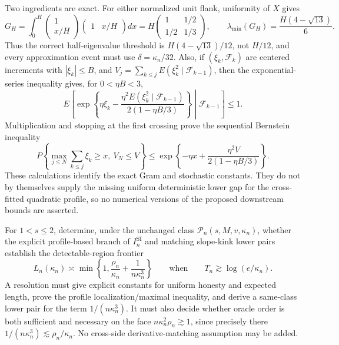 Two ingredients are exact.  For either normalized unit flank,
uniformity of \(X\) gives
\[
 G_H=\int_0^H
 \begin{pmatrix}1\\x/H\end{pmatrix}
 \begin{pmatrix}1&x/H\end{pmatrix}dx
 =H\begin{pmatrix}1&1/2\\1/2&1/3\end{pmatrix},
 \qquad
 \lambda_{\min}(G_H)=\frac{H(4-\sqrt{13})}{6}.
\]
Thus the correct half-eigenvalue threshold is
\(H(4-\sqrt{13})/12\), not \(H/12\), and every approximation event
must use \(\delta=\kappa_n/32\).  Also, if
\((\xi_k,\mathcal F_k)\) are centered increments with
\(|\xi_k|\le B\), and
\(V_j=\sum_{k\le j}E(\xi_k^2\mid\mathcal F_{k-1})\), then the
exponential-series inequality gives, for \(0<\eta B<3\),
\[
 E\left[\exp\left\{\eta\xi_k-
 \frac{\eta^2E(\xi_k^2\mid\mathcal F_{k-1})}
 {2(1-\eta B/3)}\right\}\middle|\mathcal F_{k-1}\right]\le1.
\]
Multiplication and stopping at the first crossing prove the sequential
Bernstein inequality
\[
 P\left\{\max_{j\le N}\sum_{k\le j}\xi_k\ge x,
                 \ V_N\le V\right\}
 \le\exp\left\{-\eta x+
 \frac{\eta^2V}{2(1-\eta B/3)}\right\}.
\]
These calculations identify the exact Gram and stochastic constants.
They do not by themselves supply the missing uniform deterministic
lower gap for the cross-fitted quadratic profile, so no numerical
versions of the proposed downstream bounds are asserted.

For \(1<s\le2\), determine, under the unchanged class
\(\mathcal P_n(s,M,v,\kappa_n)\), whether the explicit profile-based
branch of \(I_n^{\mathrm{SI}}\) and matching slope-kink lower pairs
establish the detectable-region frontier
\[
 L_n(\kappa_n)\asymp
 \min\left\{1,\frac{\rho_n}{\kappa_n}
                  +\frac1{n\kappa_n^3}\right\}
 \qquad\text{when}\qquad
 T_n\gtrsim\log(e/\kappa_n).
\]
A resolution must give explicit constants for uniform honesty and
expected length, prove the profile localization/maximal inequality, and
derive a same-class lower pair for the term \(1/(n\kappa_n^3)\).
It must also decide whether oracle order is both sufficient and
necessary on the face \(n\kappa_n^2\rho_n\gtrsim1\), since precisely
there \(1/(n\kappa_n^3)\lesssim\rho_n/\kappa_n\).  No cross-side
derivative-matching assumption may be added.

